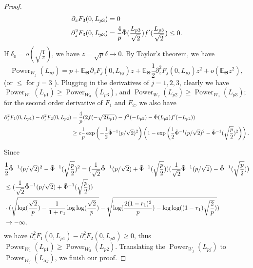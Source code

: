 \documentclass[12pt]{article}
\newcommand{\E}{\mathbb{E}}
\theoremstyle{plain}
\begin{document}
\begin{proof}
	\begin{equation*}
		\begin{aligned}
			\partial_z   F_3(0,L_{p 3}) & = 0 \\
			\partial_z^2   F_3(0,L_{p 3}) & = \frac{4 }{p} \Tilde{\Phi}(\frac{L_{p 3}}{\sqrt{2}} )f'(\frac{L_{p 3}}{\sqrt{2}})\le 0.
		\end{aligned}
	\end{equation*}
	If $\delta_0=o(\sqrt{\frac{1}{\pi} }) $, we have $z=\sqrt{p}\delta\to 0$. By Taylor's theorem, we have
	$$\operatorname{Power}_{W_j}(L_{p j} ) = p + \E_{\mathbf{\Theta}} \partial_z   F_j(0,L_{p j})z +  \E_{\mathbf{\Theta}} \frac{1}{2}\partial_z^2   F_j(0,L_{p j})z^2 +o( \E_{\mathbf{\Theta}} z^2),$$
	(or $\le$ for $j=3$ ). Plugging in the derivatives of $j=1,2,3$, clearly we have $\operatorname{Power}_{W_1}(L_{p 1} )\ge \operatorname{Power}_{W_3}(L_{p 3} )$, and $\operatorname{Power}_{W_2}(L_{p 2} )\ge \operatorname{Power}_{W_3}(L_{p 3} )$; for the second order derivative of $F_1$ and $F_2$, we also have 
	\begin{equation*}
		\begin{aligned}
			\partial_z^2   F_1(0,L_{p 1})- \partial_z^2   F_2(0,L_{p 2}) 
			& = \frac{4 }{p} (2f(-\sqrt{2L_{p 1}}) -f^2(-L_{p 2}) -\Tilde{\Phi}(L_{p 2})f'(-L_{p 2})  ) \\
			&\ge c \frac{1}{p}\exp\left(- \frac{1}{2} \Tilde{\Phi}^{-1}(p/\sqrt{2})^2 \right)\left(1 - \exp\left(\frac{1}{2} \Tilde{\Phi}^{-1}(p/\sqrt{2})^2  - \Tilde{\Phi}^{-1}(\sqrt{\frac{p}{2} })^2 \right) \right).
		\end{aligned}
	\end{equation*}
	
	Since
	\begin{equation*}
		\begin{aligned}
			&\frac{1}{2} \Tilde{\Phi}^{-1}(p/\sqrt{2})^2  - \Tilde{\Phi}^{-1}(\sqrt{\frac{p}{2} })^2= (\frac{1}{\sqrt{2}} \Tilde{\Phi}^{-1}(p/\sqrt{2}) + \Tilde{\Phi}^{-1}(\sqrt{\frac{p}{2} }) )(\frac{1}{\sqrt{2}} \Tilde{\Phi}^{-1}(p/\sqrt{2}) - \Tilde{\Phi}^{-1}(\sqrt{\frac{p}{2} }) ) \\
			&\le (\frac{1}{\sqrt{2}} \Tilde{\Phi}^{-1}(p/\sqrt{2}) + \Tilde{\Phi}^{-1}(\sqrt{\frac{p}{2} }) ) \\
			& \cdot ( \sqrt{\log(\frac{\sqrt{2}}{p})  - \frac{1}{1+r_2}\log \log(\frac{\sqrt{2}}{p}) } - \sqrt{\log (\frac{2(1-r_1)^2}{p} ) -\log\log( (1-r_1)\sqrt{\frac{2}{p}} )  } ) \\
			&\to -\infty,
		\end{aligned}
	\end{equation*}
	we have $\partial_z^2   F_1(0,L_{p 1})- \partial_z^2   F_2(0,L_{p 2}) \ge 0$, thus $\operatorname{Power}_{W_1}(L_{p 1} )\ge \operatorname{Power}_{W_2}(L_{p 2} )$. Translating the $\operatorname{Power}_{W_j}(L_{p j} )$ to $\operatorname{Power}_{W_j}(L_{\alpha j} )$, we finish our proof. 
\end{proof}
\end{document}
